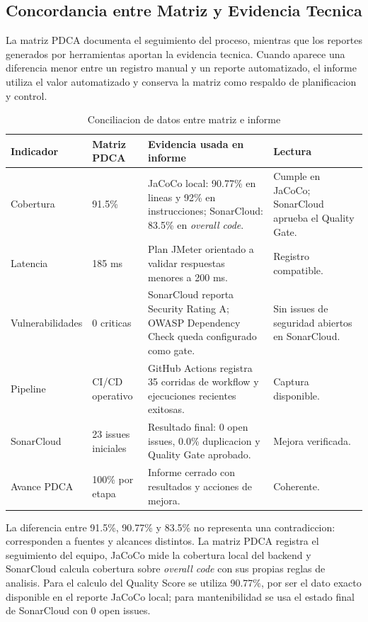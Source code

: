 \documentclass[11pt,oneside]{article}
\begin{document}
\subsection{Concordancia entre Matriz y Evidencia Tecnica}

La matriz PDCA documenta el seguimiento del proceso, mientras que los reportes generados por herramientas aportan la evidencia tecnica. Cuando aparece una diferencia menor entre un registro manual y un reporte automatizado, el informe utiliza el valor automatizado y conserva la matriz como respaldo de planificacion y control.

\begin{table}[H]
\centering
\small
\caption{Conciliacion de datos entre matriz e informe}
\begin{tabularx}{\textwidth}{p{}p{}Yp{.18\textwidth}}
\toprule
Indicador & Matriz PDCA & Evidencia usada en informe & Lectura\\
\midrule
Cobertura & 91.5\% & JaCoCo local: 90.77\% en lineas y 92\% en instrucciones; SonarCloud: 83.5\% en \textit{overall code}. & Cumple en JaCoCo; SonarCloud aprueba el Quality Gate.\\
Latencia & 185 ms & Plan JMeter orientado a validar respuestas menores a 200 ms. & Registro compatible.\\
Vulnerabilidades & 0 criticas & SonarCloud reporta Security Rating A; OWASP Dependency Check queda configurado como gate. & Sin issues de seguridad abiertos en SonarCloud.\\
Pipeline & CI/CD operativo & GitHub Actions registra 35 corridas de workflow y ejecuciones recientes exitosas. & Captura disponible.\\
SonarCloud & 23 issues iniciales & Resultado final: 0 open issues, 0.0\% duplicacion y Quality Gate aprobado. & Mejora verificada.\\
Avance PDCA & 100\% por etapa & Informe cerrado con resultados y acciones de mejora. & Coherente.\\
\bottomrule
\end{tabularx}
\end{table}

La diferencia entre 91.5\%, 90.77\% y 83.5\% no representa una contradiccion: corresponden a fuentes y alcances distintos. La matriz PDCA registra el seguimiento del equipo, JaCoCo mide la cobertura local del backend y SonarCloud calcula cobertura sobre \textit{overall code} con sus propias reglas de analisis. Para el calculo del Quality Score se utiliza 90.77\%, por ser el dato exacto disponible en el reporte JaCoCo local; para mantenibilidad se usa el estado final de SonarCloud con 0 open issues.
\end{document}
